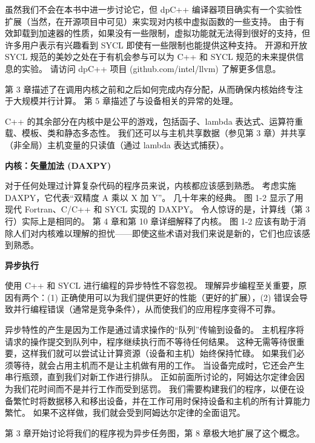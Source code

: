 \begin{remark}[虚函数]
	虽然我们不会在本书中进一步讨论它，但 dpC++ 编译器项目确实有一个实验性扩展（当然，在开源项目中可见）来实现对内核中虚拟函数的一些支持。 由于有效卸载到加速器的性质，如果没有一些限制，虚拟功能就无法得到很好的支持，但许多用户表示有兴趣看到 SYCL 即使有一些限制也能提供这种支持。 开源和开放 SYCL 规范的美妙之处在于有机会参与可以为 C++ 和 SYCL 规范的未来提供信息的实验。 请访问 dpC++ 项目 (github.com/intel/llvm) 了解更多信息。
\end{remark}

第 3 章描述了在调用内核之前和之后如何完成内存分配，从而确保内核始终专注于大规模并行计算。 第 5 章描述了与设备相关的异常的处理。

C++ 的其余部分在内核中是公平的游戏，包括函子、lambda 表达式、运算符重载、模板、类和静态多态性。 我们还可以与主机共享数据（参见第 3 章）并共享（非全局）主机变量的只读值（通过 lambda 表达式捕获）。

\textbf{内核：矢量加法 (DAXPY)}

对于任何处理过计算复杂代码的程序员来说，内核都应该感到熟悉。 考虑实施 DAXPY，它代表“双精度 A 乘以 X 加 Y”。 几十年来的经典。 图 1-2 显示了用现代 Fortran、C/C++ 和 SYCL 实现的 DAXPY。 令人惊讶的是，计算线（第 3 行）实际上是相同的。 第 4 章和第 10 章详细解释了内核。 图 1-2 应该有助于消除人们对内核难以理解的担忧——即使这些术语对我们来说是新的，它们也应该感到熟悉。

\textbf{异步执行}

使用 C++ 和 SYCL 进行编程的异步特性不容忽视。 理解异步编程至关重要，原因有两个：(1) 正确使用可以为我们提供更好的性能（更好的扩展），(2) 错误会导致并行编程错误（通常是竞争条件），从而使我们的应用程序变得不可靠。

异步特性的产生是因为工作是通过请求操作的“队列”传输到设备的。 主机程序将请求的操作提交到队列中，程序继续执行而不等待任何结果。 这种无需等待很重要，这样我们就可以尝试让计算资源（设备和主机）始终保持忙碌。 如果我们必须等待，就会占用主机而不是让主机做有用的工作。 当设备完成时，它还会产生串行瓶颈，直到我们对新工作进行排队。 正如前面所讨论的，阿姆达尔定律会因为我们花时间而不是并行工作而受到惩罚。 我们需要构建我们的程序，以便在设备繁忙时将数据移入和移出设备，并在工作可用时保持设备和主机的所有计算能力繁忙。 如果不这样做，我们就会受到阿姆达尔定律的全面诅咒。

第 3 章开始讨论将我们的程序视为异步任务图，第 8 章极大地扩展了这个概念。

